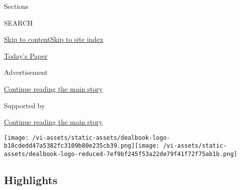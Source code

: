 Sections

SEARCH

\protect\hyperlink{site-content}{Skip to
content}\protect\hyperlink{site-index}{Skip to site index}

\href{https://myaccount.nytimes3xbfgragh.onion/auth/login?response_type=cookie\&client_id=vi}{}

\href{https://www.nytimes3xbfgragh.onion/section/todayspaper}{Today's
Paper}

Advertisement

\protect\hyperlink{after-top}{Continue reading the main story}

Supported by

\protect\hyperlink{after-sponsor}{Continue reading the main story}

\texttt{[image: /vi-assets/static-assets/dealbook-logo-b18cdedd47a5382fc3109b80e235cb39.png]}\texttt{[image: /vi-assets/static-assets/dealbook-logo-reduced-7ef9bf245f53a22de79f41f72f75ab1b.png]}

\hypertarget{highlights}{%
\subsection{Highlights}\label{highlights}}


